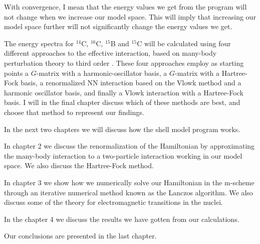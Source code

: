 With convergence, I mean that the energy values we get from the program will
not change when we increase our model space. This will imply that increasing
our model space further will not significantly change the energy values we get.

The energy spectra for $^{14}$C, $^{16}$C, $^{15}$B and $^{15}$C will be
calculated using four different approaches to the effective interaction, based
on many-body perturbation theory to third order \citep{g261}. These four
approaches employ as starting points a $G$-matrix with a harmonic-oscillator
basis, a $G$-matrix with a Hartree-Fock basis, a renormalized NN interaction
based on the Vlowk method \citep{G-matrix} and a harmonic oscillator basis, and
finally a Vlowk interaction with a Hartree-Fock basis. I will in the final
chapter discuss which of these methods are best, and choose that method to
represent our findings.


In the next two chapters we will discuss how the shell model program works.

In chapter 2 we discuss the renormalization of the Hamiltonian by approximating
the many-body interaction to a two-particle interaction working in our
model space. We also discuss the Hartree-Fock method.

In chapter 3 we show how we numerically solve our Hamiltonian in the m-scheme
through an iterative numerical method known as the Lanczos algorithm. We also
discuss some of the theory for electromagnetic transitions in the nuclei.

In the chapter 4 we discuss the results we have gotten from our calculations.

Our conclusions are presented in the last chapter.


